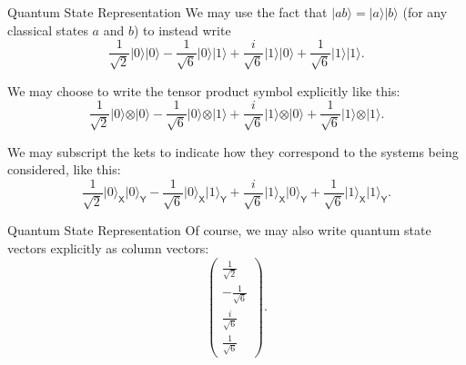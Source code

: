 \documentclass[12pt, aspectratio=169]{beamer}
\begin{document}
\begin{frame}{Quantum State Representation}
    We may use the fact that \(\vert ab\rangle = \vert a\rangle\vert b\rangle\) (for any classical states \(a\) and \(b\)) to instead write
    \[
    \frac{1}{\sqrt{2}} \vert 0\rangle\vert 0 \rangle - \frac{1}{\sqrt{6}} \vert 0\rangle\vert 1\rangle + \frac{i}{\sqrt{6}} \vert 1\rangle\vert 0\rangle + \frac{1}{\sqrt{6}} \vert 1\rangle\vert 1\rangle.
    \]

    We may choose to write the tensor product symbol explicitly like this:
    \[
    \frac{1}{\sqrt{2}} \vert 0\rangle\otimes\vert 0 \rangle - \frac{1}{\sqrt{6}} \vert 0\rangle\otimes\vert 1\rangle + \frac{i}{\sqrt{6}} \vert 1\rangle\otimes\vert 0\rangle + \frac{1}{\sqrt{6}} \vert 1\rangle\otimes\vert 1\rangle.
    \]

    We may subscript the kets to indicate how they correspond to the systems being considered, like this:
    \[
    \frac{1}{\sqrt{2}} \vert 0\rangle_{\mathsf{X}}\vert 0 \rangle_{\mathsf{Y}} - \frac{1}{\sqrt{6}} \vert 0\rangle_{\mathsf{X}}\vert 1\rangle_{\mathsf{Y}} + \frac{i}{\sqrt{6}} \vert 1\rangle_{\mathsf{X}}\vert 0\rangle_{\mathsf{Y}} + \frac{1}{\sqrt{6}} \vert 1\rangle_{\mathsf{X}}\vert 1\rangle_{\mathsf{Y}}.
    \]
\end{frame}
\begin{frame}{Quantum State Representation}
    Of course, we may also write quantum state vectors explicitly as column vectors:
    \[
    \begin{pmatrix}
        \frac{1}{\sqrt{2}}\\[2mm]
        - \frac{1}{\sqrt{6}}\\[2mm]
        \frac{i}{\sqrt{6}}\\[2mm]
        \frac{1}{\sqrt{6}}
    \end{pmatrix}.
    \]
\end{frame}
\end{document}
